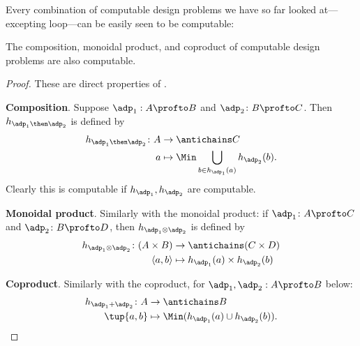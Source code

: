 Every combination of computable design problems we have so far looked at---excepting loop---can be easily seen to be computable:

\begin{proposition}
    The composition, monoidal product, and coproduct of computable design problems are also computable.
\end{proposition}

\begin{proof}
    These are direct properties of \DP.

     

    \textbf{Composition}. Suppose $\adp_1 : A \profto B$ and $\adp_2 \colon B \profto C$. Then $h_{\adp_1\then \adp_2} $ is defined by
    \begin{equation}
        \begin{aligned}
            h_{\adp_1 \then \adp_2} \colon A &\to \antichains C \\
            a &\mapsto \Min \bigcup_{b \in h_{\adp_1}(a)} h_{\adp_2}(b).
        \end{aligned}
    \end{equation}
    Clearly this is computable if $h_{\adp_1}, h_{\adp_2}$ are computable.

     

    \textbf{Monoidal product}. Similarly with the monoidal product: if $\adp_1 \colon A \profto C$ and $\adp_2 \colon B \profto D$, then $h_{\adp_1 \otimes \adp_2}$ is defined by
    \begin{equation}
        \begin{aligned}
            h_{\adp_1 \otimes \adp_2} \colon (A \times B) &\to \antichains (C \times D) \\
            \langle a, b \rangle &\mapsto h_{\adp_1}(a) \times h_{\adp_2}(b)
        \end{aligned}
    \end{equation}

    \textbf{Coproduct}. Similarly with the coproduct, for $\adp_1, \adp_2 : A \profto B$ below:
    \begin{equation}
        \begin{aligned}
            h_{\adp_1 + \adp_2} \colon  A &\to \antichains B \\
            \tup{a,b} &\mapsto \Min (h_{\adp_1}(a) \cup h_{\adp_2}(b)).
        \end{aligned}
    \end{equation}

     
\end{proof}

